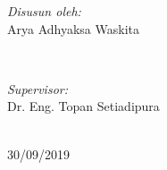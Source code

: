 \begin{titlepage}
 

\begin{minipage}{0.4\textwidth}
\begin{flushleft} \large
\emph{Disusun oleh:}\\
Arya Adhyaksa Waskita
\end{flushleft}
\end{minipage}
~
\begin{minipage}{0.4\textwidth}
\begin{flushright} \large
\emph{Supervisor:} \\
Dr. Eng. Topan Setiadipura
\end{flushright}
\end{minipage}\\[4cm]



{\large 30/09/2019}\\[3cm] %
 

\vfill %

\end{titlepage}
